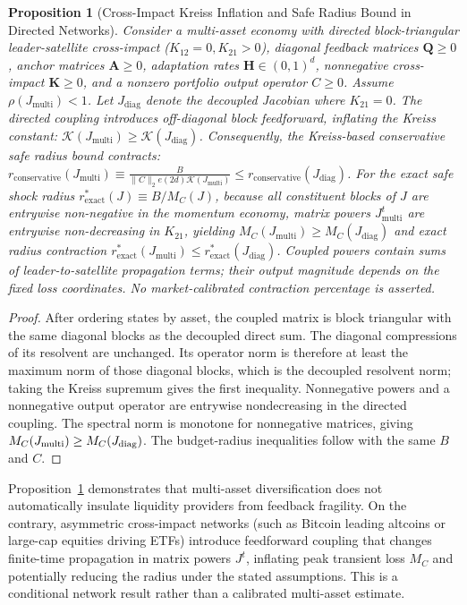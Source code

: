 \documentclass[12pt]{article}
\newtheorem{proposition}[theorem]{Proposition}
\theoremstyle{definition}
\theoremstyle{remark}
\begin{document}
\begin{proposition}[Cross-Impact Kreiss Inflation and Safe Radius Bound in Directed Networks]
\label{prop:cross_kreiss}
Consider a multi-asset economy with directed block-triangular leader-satellite cross-impact ($K_{12} = 0, K_{21} > 0$), diagonal feedback matrices $\mathbf{Q} \ge 0$, anchor matrices $\mathbf{A} \ge 0$, adaptation rates $\mathbf{H} \in (0, 1)^d$, nonnegative cross-impact $\mathbf K\ge0$, and a nonzero portfolio output operator $C\ge0$. Assume $\rho(J_{\text{multi}})<1$. Let $J_{\text{diag}}$ denote the decoupled Jacobian where $K_{21} = 0$.
The directed coupling introduces off-diagonal block feedforward, inflating the Kreiss constant: $\mathcal{K}(J_{\text{multi}}) \ge \mathcal{K}(J_{\text{diag}})$. Consequently, the Kreiss-based conservative safe radius bound contracts: $r_{\text{conservative}}(J_{\text{multi}}) \equiv \frac{B}{\|C\|_2 e (2d)\mathcal{K}(J_{\text{multi}})} \le r_{\text{conservative}}(J_{\text{diag}})$.
For the exact safe shock radius $r^*_{\text{exact}}(J) \equiv B / M_C(J)$, because all constituent blocks of $J$ are entrywise non-negative in the momentum economy, matrix powers $J_{\text{multi}}^t$ are entrywise non-decreasing in $K_{21}$, yielding $M_C(J_{\text{multi}}) \ge M_C(J_{\text{diag}})$ and exact radius contraction $r^*_{\text{exact}}(J_{\text{multi}}) \le r^*_{\text{exact}}(J_{\text{diag}})$. Coupled powers contain sums of leader-to-satellite propagation terms; their output magnitude depends on the fixed loss coordinates. No market-calibrated contraction percentage is asserted.
\end{proposition}
\begin{proof}
After ordering states by asset, the coupled matrix is block triangular with the same diagonal blocks as the decoupled direct sum. The diagonal compressions of its resolvent are unchanged. Its operator norm is therefore at least the maximum norm of those diagonal blocks, which is the decoupled resolvent norm; taking the Kreiss supremum gives the first inequality. Nonnegative powers and a nonnegative output operator are entrywise nondecreasing in the directed coupling. The spectral norm is monotone for nonnegative matrices, giving $M_C(J_{\rm multi})\ge M_C(J_{\rm diag})$. The budget-radius inequalities follow with the same $B$ and $C$.
\end{proof}

Proposition~\ref{prop:cross_kreiss} demonstrates that multi-asset diversification does not automatically insulate liquidity providers from feedback fragility. On the contrary, asymmetric cross-impact networks (such as Bitcoin leading altcoins or large-cap equities driving ETFs) introduce feedforward coupling that changes finite-time propagation in matrix powers $J^t$, inflating peak transient loss $M_C$ and potentially reducing the radius under the stated assumptions. This is a conditional network result rather than a calibrated multi-asset estimate.
\end{document}
